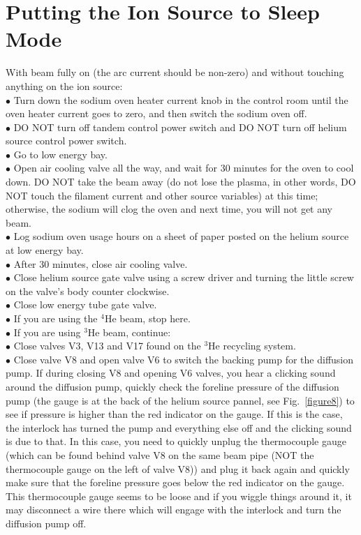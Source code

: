 \documentclass{article}
\begin{document}
\section{Putting the Ion Source to Sleep Mode}

With beam fully on (the arc current should be non-zero) and without touching anything on the ion source:\\
$\bullet$ Turn down the sodium oven heater current knob in the control room until the oven heater current goes to zero, and then switch the sodium oven off.\\
$\bullet$ DO NOT turn off tandem control power switch and DO NOT turn off helium source control power switch.\\
$\bullet$ Go to low energy bay.\\
$\bullet$ Open air cooling valve all the way, and wait for 30 minutes for the oven to cool down. DO NOT take the beam away (do not lose the plasma, in other words, DO NOT touch the filament current and other source variables) at this time; otherwise, the sodium will clog the oven and next time, you will not get any beam.\\
$\bullet$ Log sodium oven usage hours on a sheet of paper posted on the helium source at low energy bay.\\
$\bullet$ After 30 minutes, close air cooling valve.\\
$\bullet$ Close helium source gate valve using a screw driver and turning the little screw on the valve's body counter clockwise.\\
$\bullet$ Close low energy tube gate valve.\\
$\bullet$ If you are using the $^{4}$He beam, stop here.\\
$\bullet$ If you are using $^{3}$He beam, continue:\\
$\bullet$ Close valves V3, V13 and V17 found on the $^{3}$He recycling system.\\
$\bullet$ Close valve V8 and open valve V6 to switch the backing pump for the diffusion pump. If during closing V8 and opening V6 valves, you hear a clicking sound around the diffusion pump, quickly check the foreline pressure of the diffusion pump (the gauge is at the back of the helium source pannel, see Fig.~\ref{figure8}) to see if pressure is higher than the red indicator on the gauge. If this is the case, the interlock has turned the pump and everything else off and the clicking sound is due to that. In this case, you need to quickly unplug the thermocouple gauge (which can be found behind valve V8 on the same beam pipe (NOT the thermocouple gauge on the left of valve V8)) and plug it back again and quickly make sure that the foreline pressure goes below the red indicator on the gauge. This thermocouple gauge seems to be loose and if you wiggle things around it, it may disconnect a wire there which will engage with the interlock and turn the diffusion pump off.\\
\end{document}
